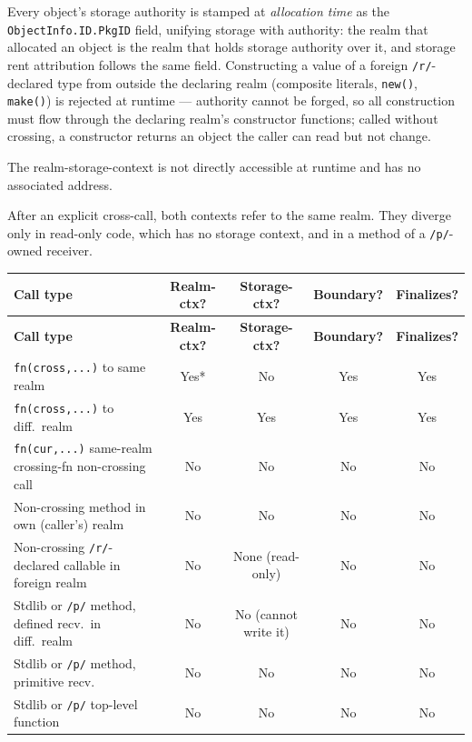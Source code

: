 \documentclass[12pt,a4paper]{article}
\newcommand{\passthrough}[1]{#1}
\begin{document}
Every object's storage authority is stamped at \emph{allocation time}
as the \passthrough{\lstinline!ObjectInfo.ID.PkgID!} field, unifying
storage with authority: the realm that allocated an object is the
realm that holds storage authority over it, and storage rent
attribution follows the same field. Constructing a value of a foreign
\passthrough{\lstinline!/r/!}-declared type from outside the declaring
realm (composite literals, \passthrough{\lstinline!new()!},
\passthrough{\lstinline!make()!}) is rejected at runtime --- authority
cannot be forged, so all construction must flow through the declaring
realm's constructor functions; called without crossing, a constructor
returns an object the caller can read but not change.

The realm-storage-context is not directly accessible at runtime and has
no associated address.

After an explicit cross-call, both contexts refer to the same realm.
They diverge only in read-only code, which has no storage context, and
in a method of a \passthrough{\lstinline!/p/!}-owned receiver.

{\small
\begin{longtable}{|p{5.5cm}|c|c|c|c|}
\hline
\textbf{Call type} & \textbf{Realm-ctx?} & \textbf{Storage-ctx?} & \textbf{Boundary?} & \textbf{Finalizes?} \\
\hline
\endfirsthead
\hline
\textbf{Call type} & \textbf{Realm-ctx?} & \textbf{Storage-ctx?} & \textbf{Boundary?} & \textbf{Finalizes?} \\
\hline
\endhead
\lstinline!fn(cross,...)! to same realm & Yes* & No & Yes & Yes \\
\hline
\lstinline!fn(cross,...)! to diff.\ realm & Yes & Yes & Yes & Yes \\
\hline
\lstinline!fn(cur,...)! same-realm crossing-fn non-crossing call & No & No & No & No \\
\hline
Non-crossing method in own (caller's) realm & No & No & No & No \\
\hline
Non-crossing \passthrough{\lstinline!/r/!}-declared callable in foreign realm & No & None (read-only) & No & No \\
\hline
Stdlib or \passthrough{\lstinline!/p/!} method, defined recv.\ in diff.\ realm & No & No (cannot write it) & No & No \\
\hline
Stdlib or \passthrough{\lstinline!/p/!} method, primitive recv. & No & No & No & No \\
\hline
Stdlib or \passthrough{\lstinline!/p/!} top-level function & No & No & No & No \\
\hline
\end{longtable}
}
\end{document}
